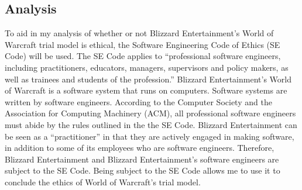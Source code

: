 \documentclass[11pt]{article}
\begin{document}
\begin{multicols}{2}


\section{Analysis}

To aid in my analysis of whether or not Blizzard Entertainment's World of Warcraft trial model is ethical, the Software Engineering Code of Ethics (SE Code) will be used. The SE Code applies to ``professional software engineers, including practitioners, educators, managers, supervisors and policy makers, as well as trainees and students of the profession.'' \cite{SECode} Blizzard Entertainment's World of Warcraft is a software system that runs on computers. \cite{WoWSystemReqs} Software systems are written by software engineers. \cite{ACMApprovesSECode} According to the Computer Society and the Association for Computing Machinery (ACM), all professional software engineers must abide by the rules outlined in the the SE Code. \cite{ACMApprovesSECode}\cite{SECode} Blizzard Entertainment can be seen as a ``practitioner'' in that they are actively engaged in making software, in addition to some of its employees who are software engineers. Therefore, Blizzard Entertainment and Blizzard Entertainment's software engineers are subject to the SE Code. \cite{SECode} Being subject to the SE Code allows me to use it to conclude the ethics of World of Warcraft's trial model.


\end{multicols}
\end{document}
